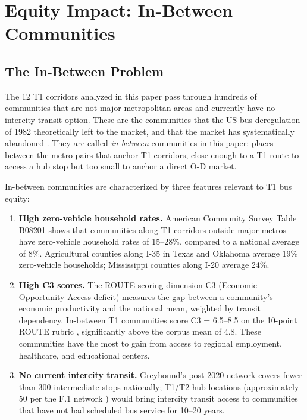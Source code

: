 \section{Equity Impact: In-Between Communities}
\label{sec:equity}

\subsection{The In-Between Problem}

The 12 T1 corridors analyzed in this paper pass through hundreds of communities that are not major metropolitan areas and currently have no intercity transit option. These are the communities that the US bus deregulation of 1982 \citep{BusRegulatoryReform1982} theoretically left to the market, and that the market has systematically abandoned \citep{Schwieterman2019}. They are called \emph{in-between} communities in this paper: places between the metro pairs that anchor T1 corridors, close enough to a T1 route to access a hub stop but too small to anchor a direct O-D market.

In-between communities are characterized by three features relevant to T1 bus equity:
\begin{enumerate}
  \item \textbf{High zero-vehicle household rates.} American Community Survey Table B08201 \citep{ACS_B08201_2022} shows that communities along T1 corridors outside major metros have zero-vehicle household rates of 15--28\%, compared to a national average of 8\%. Agricultural counties along I-35 in Texas and Oklahoma average 19\% zero-vehicle households; Mississippi counties along I-20 average 24\%.

  \item \textbf{High C3 scores.} The ROUTE scoring dimension C3 (Economic Opportunity Access deficit) measures the gap between a community's economic productivity and the national mean, weighted by transit dependency. In-between T1 communities score C3 = 6.5--8.5 on the 10-point ROUTE rubric \citep{ROUTE_A1}, significantly above the corpus mean of 4.8. These communities have the most to gain from access to regional employment, healthcare, and educational centers.

  \item \textbf{No current intercity transit.} Greyhound's post-2020 network covers fewer than 300 intermediate stops nationally; T1/T2 hub locations (approximately 50 per the F.1 network \citep{ROUTE_F1}) would bring intercity transit access to communities that have not had scheduled bus service for 10--20 years.
\end{enumerate}

